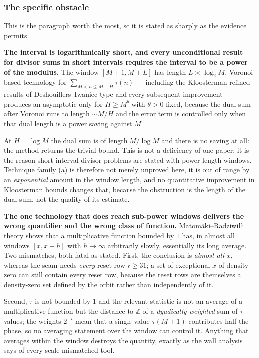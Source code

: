 \documentclass[11pt]{article}
\theoremstyle{plain}
\theoremstyle{definition}
\theoremstyle{remark}
\newcommand{\Z}{\mathbb{Z}}
\begin{document}
\subsubsection*{The specific obstacle}

This is the paragraph worth the most, so it is stated as sharply as the evidence permits.

\textbf{The interval is logarithmically short, and every unconditional result for divisor sums in
short intervals requires the interval to be a power of the modulus.} The window
$[M+1,M+L]$ has length $L\asymp\log_2 M$. Voronoi-based technology for $\sum_{M<n\le M+H}\tau(n)$
--- including the Kloosterman-refined results of Deshouillers--Iwaniec type and every subsequent
improvement --- produces an asymptotic only for $H\ge M^{\theta}$ with $\theta>0$ fixed, because
the dual sum after Voronoi runs to length $\sim M/H$ and the error term is controlled only when
that dual length is a power saving against $M$.

At $H=\log M$ the dual sum is of length $M/\log M$
and there is no saving at all: the method returns the trivial bound. This is not a deficiency of
one paper; it is the reason short-interval divisor problems are stated with power-length windows.
Technique family (a) is therefore not merely unproved here, it is out of range by an
\emph{exponential} amount in the window length, and no quantitative improvement in Kloosterman
bounds changes that, because the obstruction is the length of the dual sum, not the quality of
its estimate.

\textbf{The one technology that does reach sub-power windows delivers the wrong quantifier and
the wrong class of function.} Matom\"aki--Radziwi\l{}\l{} theory shows that a multiplicative
function bounded by $1$ has, in almost all windows $[x,x+h]$ with $h\to\infty$ arbitrarily
slowly, essentially its long average. Two mismatches, both fatal as stated. First, the conclusion
is \emph{almost all} $x$, whereas the seam needs \emph{every} reset row $r\ge31$; a set of
exceptional $x$ of density zero can still contain every reset row, because the reset rows are
themselves a density-zero set defined by the orbit rather than independently of it.

Second,
$\tau$ is not bounded by $1$ and the relevant statistic is not an average of a multiplicative
function but the distance to $\Z$ of a \emph{dyadically weighted} sum of $\tau$-values; the
weights $2^{-i}$ mean that a single value $\tau(M+1)$ contributes half the phase, so no averaging
statement over the window can control it. Anything that averages within the window destroys the
quantity, exactly as the wall analysis says of every scale-mismatched tool.
\end{document}
